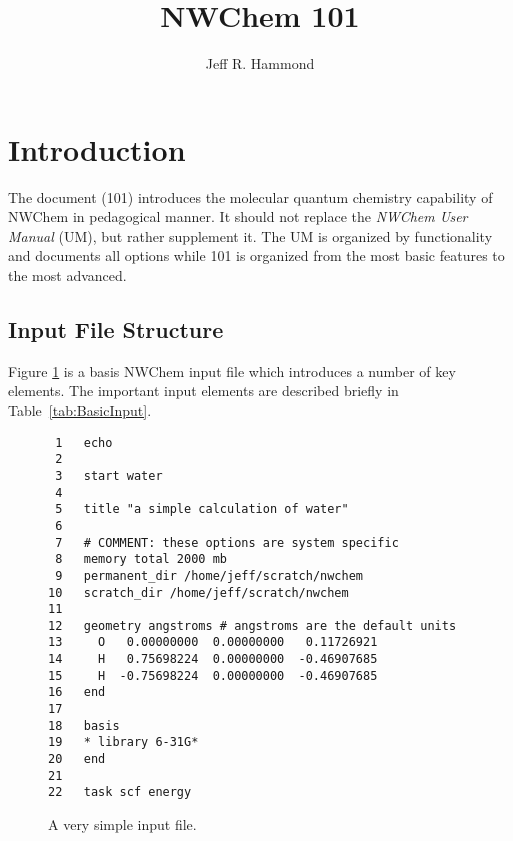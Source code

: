 \documentclass[letterpaper,12pt]{article}
\title{NWChem 101}
\author{Jeff R. Hammond}
\begin{document}
\maketitle

\begin{abstract}

\end{abstract}

\section{Introduction}\label{sec:Introduction}

The document (101) introduces the molecular quantum chemistry capability of NWChem in pedagogical manner.  It should not replace the \textit{NWChem User Manual} (UM), but rather supplement it.  The UM is organized by functionality and documents all options while 101 is organized from the most basic features to the most advanced.

\subsection{Input File Structure}\label{sec:InputFileStructure}

Figure \ref{fig:WaterSimple} is a basis NWChem input file which introduces a number of key elements.  The important input elements are described briefly in Table~\ref{tab:BasicInput}.

\begin{figure}
    \caption{A very simple input file.}
    \label{fig:WaterSimple}
    \begin{verbatim}
 1   echo
 2
 3   start water
 4 
 5   title "a simple calculation of water"
 6
 7   # COMMENT: these options are system specific
 8   memory total 2000 mb
 9   permanent_dir /home/jeff/scratch/nwchem
10   scratch_dir /home/jeff/scratch/nwchem
11
12   geometry angstroms # angstroms are the default units
13     O   0.00000000  0.00000000   0.11726921
14     H   0.75698224  0.00000000  -0.46907685
15     H  -0.75698224  0.00000000  -0.46907685
16   end
17
18   basis
19   * library 6-31G*
20   end
21
22   task scf energy
    \end{verbatim}
\end{figure}
\end{document}
